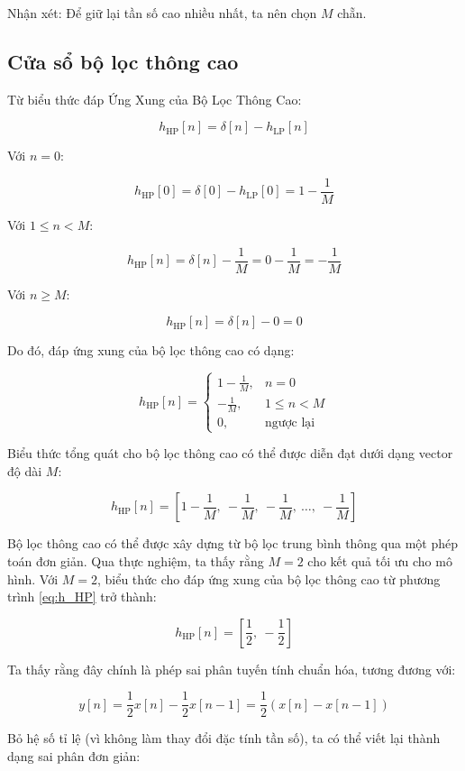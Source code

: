 Nhận xét: Để giữ lại tần số cao nhiều nhất, ta nên chọn \( M \) chẵn.

\subsection*{Cửa sổ bộ lọc thông cao}
\label{sec:cua_so_loc_thong_cao}

Từ biểu thức đáp Ứng Xung của Bộ Lọc Thông Cao:

\[
h_{\mathrm{HP}}[n] = \delta[n] - h_{\mathrm{LP}}[n]
\]

Với \( n = 0 \):

\[
h_{\mathrm{HP}}[0] = \delta[0] - h_{\mathrm{LP}}[0] = 1 - \frac{1}{M}
\]

Với \( 1 \leq n < M \):

\[
h_{\mathrm{HP}}[n] = \delta[n] - \frac{1}{M} = 0 - \frac{1}{M} = -\frac{1}{M}
\]

Với \( n \geq M \):

\[
h_{\mathrm{HP}}[n] = \delta[n] - 0 = 0
\]

Do đó, đáp ứng xung của bộ lọc thông cao có dạng:

\[
h_{\mathrm{HP}}[n] =
\begin{cases}
	1 - \frac{1}{M}, & n = 0 \\
	-\frac{1}{M}, & 1 \leq n < M \\
	0, & \text{ngược lại}
\end{cases}
\]

Biểu thức tổng quát cho bộ lọc thông cao có thể được diễn đạt dưới dạng vector độ dài \( M \):

\begin{equation}
	\label{eq:h_HP}
	h_{\mathrm{HP}}[n] = \left[ 1 - \frac{1}{M},\ -\frac{1}{M},\ -\frac{1}{M},\ \ldots,\ -\frac{1}{M} \right]
\end{equation}
%

Bộ lọc thông cao có thể được xây dựng từ bộ lọc trung bình thông qua một phép toán đơn giản. Qua thực nghiệm, ta thấy rằng \( M = 2 \) cho kết quả tối ưu cho mô hình.
%
Với \( M = 2 \), biểu thức cho đáp ứng xung của bộ lọc thông cao từ phương trình \eqref{eq:h_HP} trở thành:

\[
h_{\mathrm{HP}}[n] = \left[ \frac{1}{2},\ -\frac{1}{2} \right]
\]

Ta thấy rằng đây chính là {phép sai phân tuyến tính chuẩn hóa}, tương đương với:

\[
y[n] = \frac{1}{2}x[n] - \frac{1}{2}x[n-1] = \frac{1}{2}(x[n] - x[n-1])
\]

Bỏ hệ số tỉ lệ (vì không làm thay đổi đặc tính tần số), ta có thể viết lại thành dạng sai phân đơn giản:

